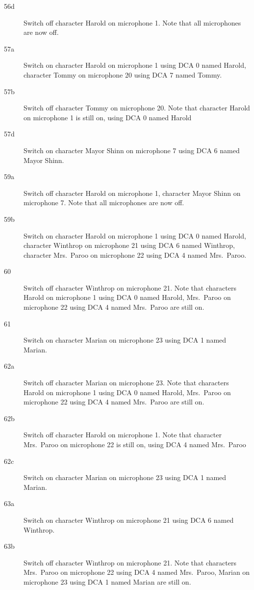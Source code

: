 \begin{description}
\item[56d]
Switch off character Harold on microphone 1. Note that all microphones are now off.

\item[57a]
Switch on character Harold on microphone 1 using DCA 0 named Harold, character Tommy on microphone 20 using DCA 7 named Tommy. 

\item[57b]
Switch off character Tommy on microphone 20. Note that character Harold on microphone 1 is still on, using DCA 0 named Harold

\item[57d]
Switch on character Mayor Shinn on microphone 7 using DCA 6 named Mayor Shinn. 

\item[59a]
Switch off character Harold on microphone 1, character Mayor Shinn on microphone 7. Note that all microphones are now off.

\item[59b]
Switch on character Harold on microphone 1 using DCA 0 named Harold, character Winthrop on microphone 21 using DCA 6 named Winthrop, character Mrs.~Paroo on microphone 22 using DCA 4 named Mrs.~Paroo. 

\item[60]
Switch off character Winthrop on microphone 21. Note that characters Harold on microphone 1 using DCA 0 named Harold, Mrs.~Paroo on microphone 22 using DCA 4 named Mrs.~Paroo are still on.  

\item[61]
Switch on character Marian on microphone 23 using DCA 1 named Marian. 

\item[62a]
Switch off character Marian on microphone 23. Note that characters Harold on microphone 1 using DCA 0 named Harold, Mrs.~Paroo on microphone 22 using DCA 4 named Mrs.~Paroo are still on.  

\item[62b]
Switch off character Harold on microphone 1. Note that character Mrs.~Paroo on microphone 22 is still on, using DCA 4 named Mrs.~Paroo

\item[62c]
Switch on character Marian on microphone 23 using DCA 1 named Marian. 

\item[63a]
Switch on character Winthrop on microphone 21 using DCA 6 named Winthrop. 

\item[63b]
Switch off character Winthrop on microphone 21. Note that characters Mrs.~Paroo on microphone 22 using DCA 4 named Mrs.~Paroo, Marian on microphone 23 using DCA 1 named Marian are still on.  


\end{description}
